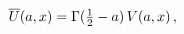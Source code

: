 \[\mathop{\overline{U}\/}\nolimits\!\left(a,x\right)=\mathop{\Gamma\/}\nolimits(%
\tfrac{1}{2}-a)\mathop{V\/}\nolimits\!\left(a,x\right),\]